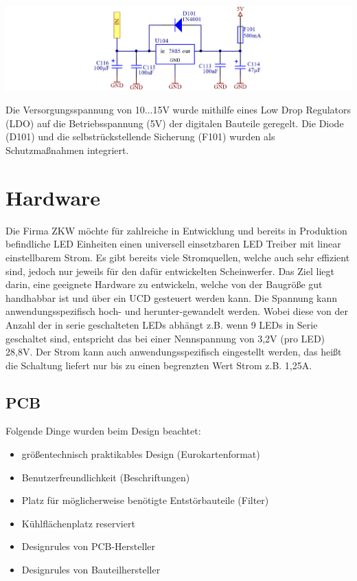 \documentclass[paper=a4, 12pt]{scrreprt}
\begin{document}
	\begin{adjustbox}{center,caption={VoltageRegulator 7805 },label={fig:VoltageRegulator.PNG},nofloat=figure,vspace=\bigskipamount}
		\includegraphics[width=\textwidth]{img/VoltageRegulator.PNG}
	\end{adjustbox}
 	Die Versorgungsspannung von 10...15V wurde mithilfe eines Low Drop Regulators (LDO) auf die Betriebsspannung (5V) der digitalen Bauteile geregelt. Die Diode (D101) und die selbstrückstellende Sicherung (F101) wurden als Schutzmaßnahmen integriert.
	\newpage
	
	\section{Hardware}\hfill \break
	Die Firma ZKW möchte für zahlreiche in Entwicklung und bereits in Produktion befindliche LED Einheiten einen universell einsetzbaren LED Treiber mit linear einstellbarem Strom. Es gibt bereits viele Stromquellen, welche auch sehr effizient sind, jedoch nur jeweils für den dafür entwickelten Scheinwerfer. 
	Das Ziel liegt darin, eine geeignete Hardware zu entwickeln, welche von der Baugröße gut handhabbar ist und über ein UCD gesteuert werden kann.
	Die Spannung kann anwendungsspezifisch hoch- und herunter-gewandelt werden. Wobei diese von der Anzahl der in serie geschalteten LEDs abhängt z.B.  wenn 9 LEDs in Serie geschaltet sind, entspricht das bei einer Nennspannung von 3,2V (pro LED) 28,8V.
	Der Strom kann auch anwendungsspezifisch eingestellt werden, das heißt die Schaltung liefert nur bis zu einen begrenzten Wert Strom z.B. 1,25A.
		\subsection{PCB}\hfill \break
		Folgende Dinge wurden beim Design beachtet:
		\hfill \break 
		\begin{center}
			\begin{minipage}{0.5\textwidth}
				\begin{itemize}
					\item größentechnisch praktikables Design (Eurokartenformat)
					\item Benutzerfreundlichkeit (Beschriftungen)
					\item Platz für möglicherweise benötigte Entstörbauteile (Filter)
					\item Kühlflächenplatz reserviert
					\item Designrules von PCB-Hersteller
					\item Designrules von Bauteilhersteller
				\end{itemize}
			\end{minipage}
		\end{center}
		\hfill \break
	\newpage
	
\end{document}
